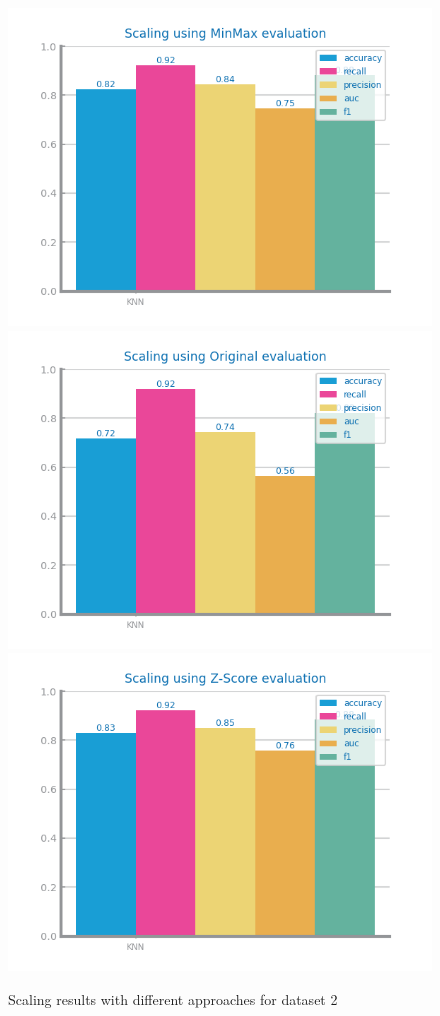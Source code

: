 \documentclass[10pt]{extarticle}
\begin{document}
\begin{figure}[H]
\centering\includegraphics[scale=0.8]{images/dataset2/data_preparation/Credit_Score_scaling_MinMax.png}
\includegraphics[scale=0.8]{images/dataset2/data_preparation/Credit_Score_scaling_Original.png}
\includegraphics[scale=0.8]{images/dataset2/data_preparation/Credit_Score_scaling_Z-Score.png}
\caption{Scaling results with different approaches for dataset 2}
\end{figure}
\end{document}

